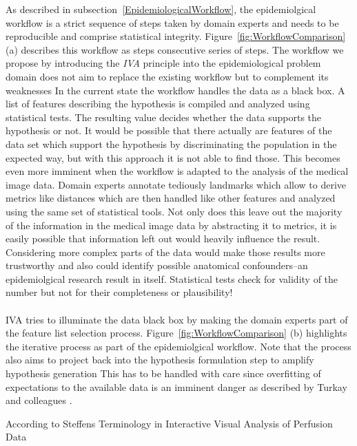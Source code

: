 \documentclass[journal]{style/vgtc}           %
\begin{document}
As described in subsection~\ref{EpidemiologicalWorkflow}, the epidemiolgical workflow is a strict sequence of steps taken by domain experts and needs to be reproducible and comprise statistical integrity.
%
Figure~\ref{fig:WorkflowComparison} (a) describes this workflow as steps consecutive series of steps.
%
The workflow we propose by introducing the \emph{IVA} principle into the epidemiological problem domain does not aim to replace the existing workflow but to complement its weaknesses 
%
In the current state the workflow handles the data as a black box.
%
A list of features describing the hypothesis is compiled and analyzed using statistical tests. 
%
The resulting value decides whether the data supports the hypothesis or not.
%
It would be possible that there actually are features of the data set which support the hypothesis by discriminating the population in the expected way, but with this approach it is not able to find those.
%
This becomes even more imminent when the workflow is adapted to the analysis of the medical image data.
%
Domain experts annotate tediously landmarks which allow to derive metrics like distances which are then handled like other features and analyzed using the same set of statistical tools.
%
Not only does this leave out the majority of the information in the medical image data by abstracting it to metrics, it is easily possible that information left out would heavily influence the result.
%
Considering more complex parts of the data would make those results more trustworthy and also could identify possible anatomical confounders--an epidemiolgical research result in itself.
%
Statistical tests check for validity of the number but not for their completeness or plausibility!
\\\\
IVA tries to illuminate the data black box by making the domain experts part of the feature list selection process.
%
Figure~\ref{fig:WorkflowComparison} (b) highlights the iterative process as part of the epidemiolgical workflow.
%
Note that the process also aims to project back into the hypothesis formulation step to amplify hypothesis generation 
%
This has to be handled with care since overfitting of expectations to the available data is an imminent danger as described by Turkay and colleagues \cite{Turkay2013}.

According to Steffens Terminology in Interactive Visual Analysis of Perfusion Data
\\\\
\end{document}
